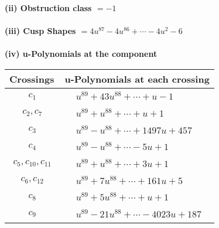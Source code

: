 \documentclass[1p]{elsarticle_modified}
\theoremstyle{definition}
\begin{document}
\flushleft \textbf{(ii) Obstruction class $= -1$}\\~\\
\flushleft \textbf{(iii) Cusp Shapes $= 4 u^{87}-4 u^{86}+\cdots-4 u^2-6$}\\~\\
\newpage\renewcommand{\arraystretch}{1}
\flushleft \textbf{(iv) u-Polynomials at the component}\newline \\
\begin{tabular}{m{50pt}|m{274pt}}
Crossings & \hspace{64pt}u-Polynomials at each crossing \\
\hline $$\begin{aligned}c_{1}\end{aligned}$$&$\begin{aligned}
&u^{89}+43 u^{88}+\cdots+u-1
\end{aligned}$\\
\hline $$\begin{aligned}c_{2},c_{7}\end{aligned}$$&$\begin{aligned}
&u^{89}+u^{88}+\cdots+u+1
\end{aligned}$\\
\hline $$\begin{aligned}c_{3}\end{aligned}$$&$\begin{aligned}
&u^{89}- u^{88}+\cdots+1497 u+457
\end{aligned}$\\
\hline $$\begin{aligned}c_{4}\end{aligned}$$&$\begin{aligned}
&u^{89}- u^{88}+\cdots-5 u+1
\end{aligned}$\\
\hline $$\begin{aligned}c_{5},c_{10},c_{11}\end{aligned}$$&$\begin{aligned}
&u^{89}+u^{88}+\cdots+3 u+1
\end{aligned}$\\
\hline $$\begin{aligned}c_{6},c_{12}\end{aligned}$$&$\begin{aligned}
&u^{89}+7 u^{88}+\cdots+161 u+5
\end{aligned}$\\
\hline $$\begin{aligned}c_{8}\end{aligned}$$&$\begin{aligned}
&u^{89}+5 u^{88}+\cdots+u+1
\end{aligned}$\\
\hline $$\begin{aligned}c_{9}\end{aligned}$$&$\begin{aligned}
&u^{89}-21 u^{88}+\cdots-4023 u+187
\end{aligned}$\\
\hline
\end{tabular}\\~\\
\end{document}

